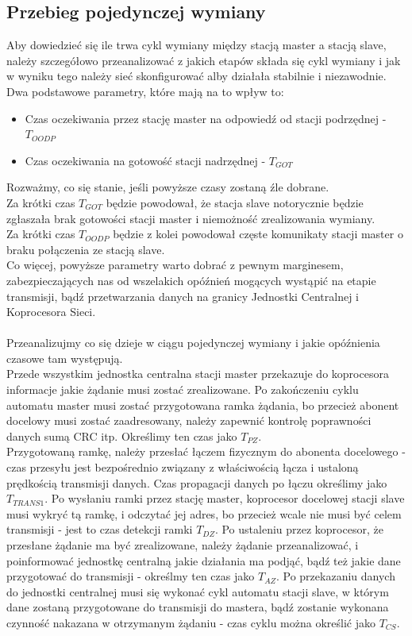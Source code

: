 	\subsection{Przebieg pojedynczej wymiany}
	Aby dowiedzieć się ile trwa cykl wymiany między stacją master a stacją slave, należy szczegółowo przeanalizować z jakich etapów składa się cykl wymiany i jak w wyniku tego należy sieć skonfigurować alby działała stabilnie i niezawodnie. Dwa podstawowe parametry, które mają na to wpływ to:
	\begin{itemize}
		\item Czas oczekiwania przez stację master na odpowiedź od stacji podrzędnej - $ T_{OODP} $
		\item Czas oczekiwania na gotowość stacji nadrzędnej -  $ T_{GOT} $
	\end{itemize}
	Rozważmy, co się stanie, jeśli powyższe czasy zostaną źle dobrane. \\ Za krótki czas $ T_{GOT} $ będzie powodował, że stacja slave notorycznie będzie zgłaszała brak gotowości stacji master i niemożność zrealizowania wymiany. \\
	Za krótki czas $ T_{OODP} $ będzie z kolei powodował częste komunikaty stacji master o braku połączenia ze stacją slave. \\
	Co więcej, powyższe parametry warto dobrać z pewnym marginesem, zabezpieczających nas od wszelakich opóźnień mogących wystąpić na etapie transmisji, bądź przetwarzania danych na granicy Jednostki Centralnej i Koprocesora Sieci.\\
	\\
	Przeanalizujmy co się dzieje w ciągu pojedynczej wymiany i jakie opóźnienia czasowe tam występują.\\
	Przede wszystkim jednostka centralna stacji master przekazuje do koprocesora informacje jakie żądanie musi zostać zrealizowane. Po zakończeniu cyklu automatu master musi zostać przygotowana ramka żądania, bo przecież abonent docelowy musi zostać zaadresowany, należy zapewnić kontrolę poprawności danych sumą CRC itp. Określimy ten czas jako $ T_{PZ} $. \\
	Przygotowaną ramkę, należy przesłać łączem fizycznym do abonenta docelowego - czas przesyłu jest bezpośrednio związany z właściwością łącza i ustaloną prędkością transmisji danych. Czas propagacji danych po łączu określimy jako $ T_{TRANS1} $. Po wysłaniu ramki przez stację master, koprocesor docelowej stacji slave musi wykryć tą ramkę, i odczytać jej adres, bo przecież wcale nie musi być celem transmisji - jest to czas detekcji ramki $ T_{DZ} $. Po ustaleniu przez koprocesor, że przesłane żądanie ma być zrealizowane, należy żądanie przeanalizować, i poinformować jednostkę centralną jakie działania ma podjąć, bądź też jakie dane przygotować do transmisji - określmy ten czas jako $ T_{AZ} $. Po przekazaniu danych do jednostki centralnej musi się wykonać cykl automatu stacji slave, w którym dane zostaną przygotowane do transmisji do mastera, bądź zostanie wykonana czynność nakazana w otrzymanym żądaniu - czas cyklu można określić jako $ T_{CS} $. 
